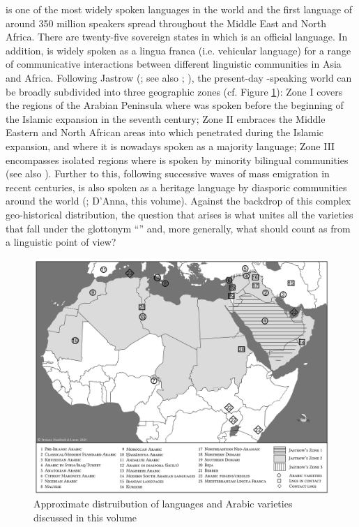 \documentclass[output=paper]{langsci/langscibook}
\begin{document}
 is one of the most widely spoken languages in the world and the first language of around 350 million speakers spread throughout the Middle East and North Africa. There are twenty-five sovereign states in which  is an official language. In addition,  is widely spoken as a lingua franca (i.e. vehicular language) for a range of communicative interactions between different linguistic communities in Asia and Africa. Following Jastrow (\citeyear{Jastrow2002}; see also \citealt{Watson2011dialectsoverview}; \citealt{Manfrediforthcoming}), the present-day -speaking world can be broadly subdivided into three geographic zones (cf. Figure \ref{intromap}): Zone I covers the regions of the Arabian Peninsula where  was spoken before the beginning of the Islamic expansion in the seventh century; Zone II embraces the Middle Eastern and North African areas into which  penetrated during the Islamic expansion, and where it is nowadays spoken as a majority language; Zone III encompasses isolated regions where  is spoken by minority bilingual communities (see also \citealt{Owens2000editor}). Further to this, following successive waves of mass emigration in recent centuries,  is also spoken as a heritage language by diasporic communities around the world (\citealt{Rouchdy_arabic_1992,BoumansdeRuiter2002}; D’Anna, this volume). Against the backdrop of this complex geo-historical distribution, the question that arises is what unites all the varieties that fall under the glottonym ``'' and, more generally, what should count as  from a linguistic point of view?

\begin{figure}
\includegraphics[width=\textwidth]{figures/intromap.jpg}
\caption{Approximate distruibution of languages and Arabic varieties discussed in this volume}
\label{intromap}
\end{figure}
\end{document}
